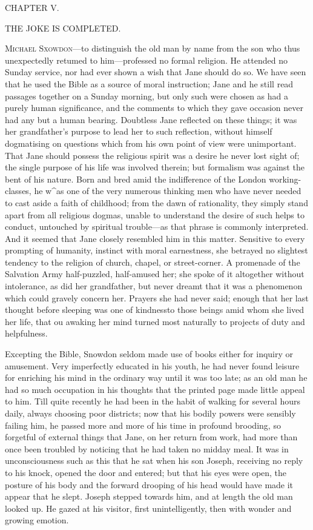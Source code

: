 {}

{CHAPTER V.}

THE JOKE IS COMPLETED.

\textsc{Michael Sxowdon}---to distinguish the old man by name from the
son who thus unexpectedly retumed to him---professed no formal religion.
He attended no Sunday service, nor had ever shown a wish that Jane
should do so. We have seen that he used the Bible as a source of moral
instruction; Jane and he still read passages together on a Sunday
morning, but only such were chosen as had a purely human significance,
and the comments to which they gave occasion never had any but a human
bearing. Doubtless Jane reflected on these things; it was her
grandfather's purpose to lead her to such reflection, without himself
dogmatising on questions which from his own point of view were
unimportant. That Jane should possess the {}religious spirit was a
desire he never lost sight of; the single purpose of his life was
involved therein; but formalism was against the bent of his nature. Born
and bred amid the indifference of the London working-classes, he w\^{}as
one of the very numerous thinking men who have never needed to cast
aside a faith of childhood; from the dawn of rationality, they simply
stand apart from all religious dogmas, unable to understand the desire
of such helps to conduct, untouched by spiritual trouble---as that
phrase is commonly interpreted. And it seemed that Jane closely
resembled him in this matter. Sensitive to every prompting of humanity,
instinct with moral earnestness, she betrayed no slightest tendency to
the religion of church, chapel, or street-corner. A promenade of the
Salvation Army half-puzzled, half-amused her; she spoke of it altogether
without intolerance, as did her grandfather, but never dreamt that it
was a phenomenon which could gravely concern her. Prayers she had never
said; enough that her last thought before sleeping was one of
{}kindnessto those beings amid whom she lived her life, that ou awaking
her mind turned most naturally to projects of duty and helpfulness.

Excepting the Bible, Snowdon seldom made use of books either for inquiry
or amusement. Very imperfectly educated in his youth, he had never found
leisure for enriching his mind in the ordinary way until it was too
late; as an old man he had so much occupation in his thoughts that the
printed page made little appeal to him. Till quite recently he had been
in the habit of walking for several hours daily, always choosing poor
districts; now that his bodily powers were sensibly failing him, he
passed more and more of his time in profound brooding, so forgetful of
external things that Jane, on her return from work, had more than once
been troubled by noticing that he had taken no midday meal. It was in
unconsciousness such as this that he sat when his son Joseph, receiving
no reply to his knock, opened the door and entered; but that his eyes
were open, the {}posture of his body and the forward drooping of his
head would have made it appear that he slept. Joseph stepped towards
him, and at length the old man looked up. He gazed at his visitor, first
unintelligently, then with wonder and growing emotion.

